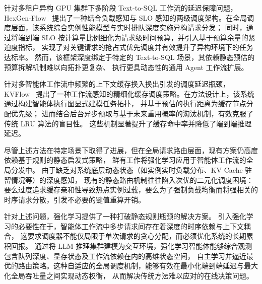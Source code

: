 针对多租户异构 GPU 集群下多阶段 Text-to-SQL 工作流的延迟保障问题，HexGen-Flow~\cite{peng2025hexgen} 
提出了一种结合负载感知与 SLO 感知的两级调度架构。在全局调度层面，该系统综合实例性能模型与实时排队深度实施异构请求分发；
同时，通过将端到端 SLO 按计算量比例细化为请求级时间预算，并引入基于预算余量的紧迫度指标，
实现了对关键请求的抢占式优先调度并有效提升了异构环境下的任务达标率。
然而，该框架深度绑定于特定的 Text-to-SQL 场景，其依赖静态预估的预算拆解机制难以向拓扑更复杂、
执行更具动态性的通用 Agent 工作流扩展。

针对多智能体工作流中频繁的上下文缓存换入换出引发的调度延迟瓶颈，KVFlow~\cite{pan2025kvflow} 
提出了一种工作流感知的精细化缓存调度策略。在方法设计上，该系统通过构建智能体执行图显式建模任务拓扑，
并基于预估的执行距离为缓存节点分配优先级；
进而结合后台异步预取与基于未来重用概率的淘汰机制，有效克服了传统 LRU 算法的盲目性。
这些机制显著提升了缓存命中率并降低了端到端推理延迟。


尽管上述方法在特定场景下取得了进展，但在全局请求路由层面，现有方案仍高度依赖基于规则的静态启发式策略，
鲜有工作将强化学习应用于智能体工作流的全局分发中。
由于缺乏对系统底层动态状态（如实例实时负载分布、KV Cache 驻留情况等）的深度感知，
现有的静态路由机制往往陷入次优的二元化调度困境：
要么过度追求缓存亲和性导致热点实例过载，要么为了强制负载均衡而将强相关的时序请求分散，引发不必要的键值重算开销。

针对上述问题，强化学习提供了一种打破静态规则瓶颈的解决方案。
引入强化学习的必要性在于，智能体工作流中多步请求间存在着深度的时序依赖与上下文耦合，
这要求调度器不能仅局限于单次请求的贪心分配，而必须优化系统的长期累积回报。
通过将 LLM 推理集群建模为交互环境，强化学习智能体能够综合观测包含队列深度、显存状态及工作流依赖在内的高维状态空间，
自主学习并逼近最优的路由策略。这种自适应的全局调度机制，能够有效在最小化端到端延迟与最大化全局吞吐量之间实现动态权衡，
从而解决传统方法难以应对的在线决策问题。



